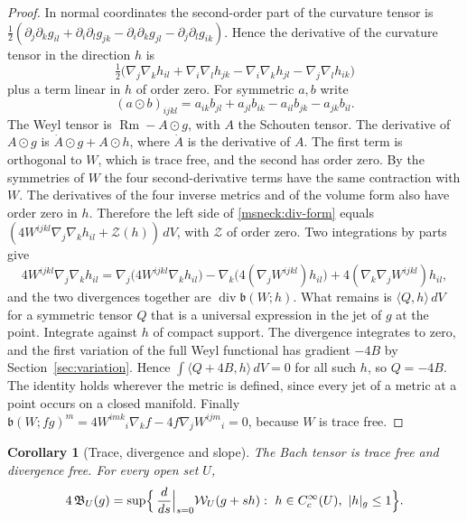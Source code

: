 \documentclass[11pt]{article}
\numberwithin{equation}{section}
\newtheorem{corollary}[theorem]{Corollary}
\theoremstyle{definition}
\theoremstyle{remark}
\DeclareMathOperator{\Rm}{Rm}
\begin{document}
\begin{proof}
In normal coordinates the second-order part of the curvature tensor is
\(\tfrac12(\partial_j\partial_kg_{il}+\partial_i\partial_lg_{jk}
-\partial_i\partial_kg_{jl}-\partial_j\partial_lg_{ik})\). Hence the
derivative of the curvature tensor in the direction \(h\) is
\[
 \tfrac12\bigl(\nabla_j\nabla_kh_{il}+\nabla_i\nabla_lh_{jk}
 -\nabla_i\nabla_kh_{jl}-\nabla_j\nabla_lh_{ik}\bigr)
\]
plus a term linear in \(h\) of order zero. For symmetric \(a,b\) write
\[
 (a\odot b)_{ijkl}=a_{ik}b_{jl}+a_{jl}b_{ik}-a_{il}b_{jk}-a_{jk}b_{il}.
\]
The Weyl tensor is \(\Rm-A\odot g\), with \(A\) the Schouten tensor.
The derivative of \(A\odot g\) is \(\dot A\odot g+A\odot h\), where \(\dot A\) is the derivative of \(A\). The first
term is orthogonal to \(W\), which is trace free, and the second has
order zero. By the symmetries of \(W\) the four second-derivative
terms have the same contraction with \(W\). The derivatives of the
four inverse metrics and of the volume form also have order zero in
\(h\). Therefore the left side of \eqref{msneck:div-form} equals
\((4W^{ijkl}\nabla_j\nabla_kh_{il}+\mathcal Z(h))\,dV\), with
\(\mathcal Z\) of order zero. Two integrations by parts give
\[
 4W^{ijkl}\nabla_j\nabla_kh_{il}
 =\nabla_j\bigl(4W^{ijkl}\nabla_kh_{il}\bigr)
 -\nabla_k\bigl(4(\nabla_jW^{ijkl})h_{il}\bigr)
 +4(\nabla_k\nabla_jW^{ijkl})h_{il},
\]
and the two divergences together are \(\operatorname{div}\mathfrak b(W;h)\).
What remains is \(\langle Q,h\rangle\,dV\) for a symmetric tensor \(Q\)
that is a universal expression in the jet of \(g\) at the point.
Integrate against \(h\) of compact support. The divergence integrates
to zero, and the first variation of the full Weyl functional has
gradient \(-4B\) by Section~\ref{sec:variation}. Hence
\(\int\langle Q+4B,h\rangle\,dV=0\) for all such \(h\), so \(Q=-4B\).
The identity holds wherever the metric is defined, since every
jet of a metric at a point occurs on a closed manifold. Finally
\(\mathfrak b(W;fg)^m=4W^{imk}{}_i\nabla_kf-4f\nabla_jW^{ijm}{}_i=0\),
because \(W\) is trace free.
\end{proof}

\begin{corollary}[Trace, divergence and slope]\label{msneck:slope}
The Bach tensor is trace free and divergence free. For every open set
\(U\),
\begin{equation}\label{msneck:slope-formula}
 4\,\mathfrak B_U(g)=\sup\Bigl\{\,\frac{d}{ds}\Big|_{s=0}\mathcal W_U(g+sh):
 \ h\in C^\infty_c(U),\ |h|_g\le1\Bigr\}.
\end{equation}
\end{corollary}
\end{document}
